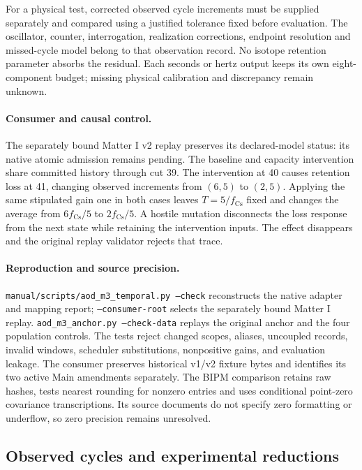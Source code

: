 For a physical test, corrected observed cycle increments must be supplied
separately and compared using a justified tolerance fixed before evaluation.
The oscillator, counter, interrogation, realization corrections, endpoint
resolution and missed-cycle model belong to that observation record.
No isotope retention parameter absorbs the residual.
Each seconds or hertz output keeps its own eight-component budget; missing
physical calibration and discrepancy remain unknown.

\paragraph{Consumer and causal control.}
The separately bound Matter I v2 replay preserves its declared-model status:
its native atomic admission remains pending. The baseline and capacity
intervention share committed history through cut 39. The intervention at 40
causes retention loss at 41, changing observed increments from \((6,5)\) to
\((2,5)\). Applying the same stipulated gain one in both cases leaves
\(T=5/f_{\mathrm{Cs}}\) fixed and changes the average from
\(6f_{\mathrm{Cs}}/5\) to \(2f_{\mathrm{Cs}}/5\).
A hostile mutation disconnects the loss response from the next state while
retaining the intervention inputs. The effect disappears and the original
replay validator rejects that trace.

\paragraph{Reproduction and source precision.}
\texttt{manual/scripts/aod\_m3\_temporal.py --check} reconstructs the native
adapter and mapping report; \texttt{--consumer-root} selects the
separately bound Matter I replay.
\texttt{aod\_m3\_anchor.py --check-data} replays the original anchor and
the four population controls. The tests reject changed scopes, aliases,
uncoupled records, invalid windows, scheduler substitutions, nonpositive gains,
and evaluation leakage. The consumer preserves historical v1/v2 fixture bytes
and identifies its two active Main amendments separately.
The BIPM comparison retains raw hashes, tests nearest rounding for nonzero
entries and uses conditional point-zero covariance transcriptions.
Its source documents do not specify zero formatting or underflow, so zero
precision remains unresolved.

\subsection{Observed cycles and experimental reductions}
\label{manual:m3-metrology}

